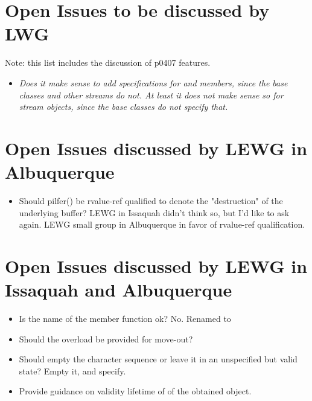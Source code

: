 \documentclass[ebook,11pt,article]{memoir}
\begin{document}
\section{Open Issues to be discussed by LWG}
Note: this list includes the discussion of p0407 features.
\begin{itemize}
\item \em{Does it make sense to add  specifications for  and  members, since the base classes and other streams do not. At least it does not make sense so for stream objects, since the base classes do not specify that.}
\end{itemize}

\section{Open Issues discussed by LEWG in Albuquerque}
\begin{itemize}
\item Should pilfer() be rvalue-ref qualified to denote the "destruction" of the underlying buffer? LEWG in Issaquah didn't think so, but I'd like to ask again. LEWG small group in Albuquerque in favor of rvalue-ref qualification.
\end{itemize}

\section{Open Issues discussed by LEWG in Issaquah and Albuquerque}
\begin{itemize}
\item Is the name of the  member function ok? No. Renamed to 
\item Should the  overload be provided for move-out? 
\item Should  empty the character sequence or leave it in an unspecified but valid state? Empty it, and specify.
\item Provide guidance on validity lifetime of of the obtained  object.
\end{itemize}
\end{document}
